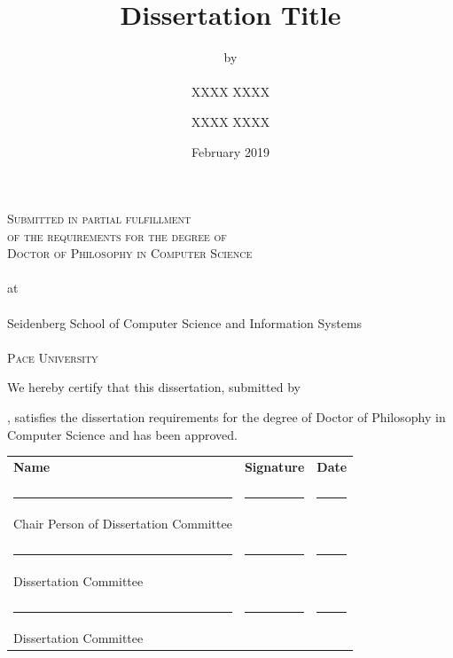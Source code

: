 \documentclass[]{article}
\title{Dissertation Title}
\author{
by
\\~\\
XXXX XXXX
}
\institute{Pace University}
\date{February 2019}
\begin{document}
\renewcommand\headrule{} %
\maketitle

\thispagestyle{empty} %

\begin{center}
\vspace{3.5cm}  %
\textsc{
\large
Submitted in partial fulfillment \\
of the requirements for the degree of \\
Doctor of Philosophy in Computer Science
}
\\~\\
at
\\~\\
Seidenberg School of Computer Science and Information Systems
\\~\\
\textsc{Pace University}

\end{center}



\newpage
\thispagestyle{empty}


We hereby certify that this dissertation, submitted by \author{XXXX XXXX}, satisfies the dissertation requirements for the degree of Doctor of Philosophy in Computer Science and has been approved.

\vspace{2.5cm}  %

\newcommand{\signaturerule}{\rule{19em}{.4pt}}
\newcommand{\daterule}{\rule{8em}{.4pt}}
\renewcommand{\arraystretch}{2.0}

\begin{tabular}{lll}
    \bfseries Name  & \bfseries Signature & \bfseries Date \\
    \\
    \signaturerule &\daterule &\daterule\\
    Chair Person of Dissertation Committee\\
    \\
    \signaturerule &\daterule &\daterule\\
    Dissertation Committee\\
    \\
    \signaturerule &\daterule &\daterule\\
    Dissertation Committee\\

\end{tabular}
\end{document}
